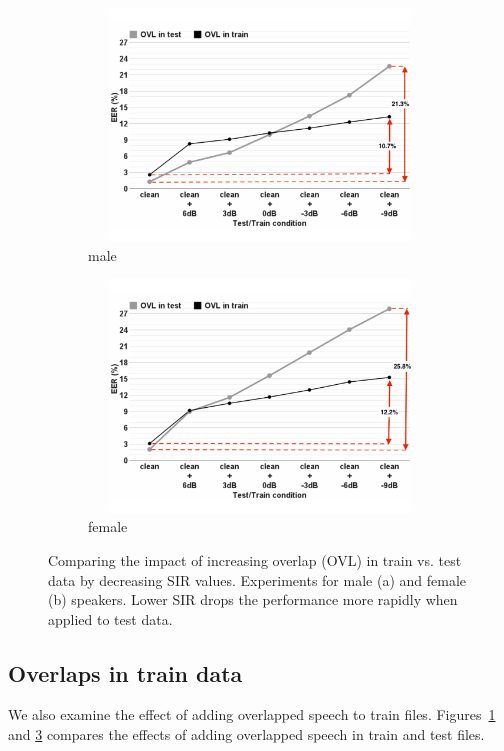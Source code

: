 {\begin{figure}[!t]
	\vspace{2mm}
	\begin{subfigure}[b]{0.3\textwidth}
		\includegraphics[height = 2.43in, width=1.6\textwidth]{figures/sidingrid_ovlintrainvstest_male_rev1}
		\caption{male}
		\label{fig:sidingrid_ovlintrainvstest_male}
	\end{subfigure}
	\begin{subfigure}[b]{0.3\textwidth}
		\hspace{0.7\textwidth}
		\includegraphics[height = 2.43in, width=1.6\textwidth]{figures/sidingrid_ovlintrainvstest_female_rev1}
		\caption{female}
		\label{fig:sidingrid_ovlintrainvstest_female}
	\end{subfigure}
	\caption{Comparing the impact of increasing overlap (OVL) in train vs. test data by decreasing SIR values. Experiments for male (a) and female (b) speakers. Lower SIR drops the performance more rapidly when applied to test data.}
	
	\vspace{2mm}
\end{figure}


\subsection{Overlaps in train data}
We also examine the effect of adding overlapped speech to train files. 
Figures~\ref{fig:sidingrid_ovlintrainvstest_male} and \ref{fig:sidingrid_ovlintrainvstest_female} compares the effects of adding overlapped speech in train and test files. 

}
